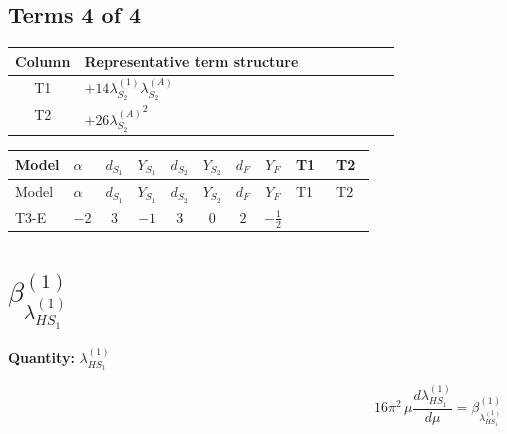\documentclass[8pt]{article}
\begin{document}
\begin{landscape}
\subsection*{Terms 4 of 4}
\begin{center}
\begin{tabular}{@{}c >{\raggedright\arraybackslash}p{0.82\linewidth}@{}}
\toprule
Column & Representative term structure \\
\midrule
T1 & \(\displaystyle +14 {\lambda_{S_2}^{(1)}} {\lambda_{S_2}^{(A)}}\) \\
\midrule
T2 & \(\displaystyle +26 {\lambda_{S_2}^{(A)}}^2\) \\
\midrule
\bottomrule
\end{tabular}
\end{center}
\smallskip
\tiny
\begin{longtable}{@{}llcccccc >{\raggedright\arraybackslash}p{0.21\linewidth} >{\raggedright\arraybackslash}p{0.21\linewidth}@{}}
\toprule
Model & $\alpha$ & $d_{S_1}$ & $Y_{S_1}$ & $d_{S_2}$ & $Y_{S_2}$ & $d_F$ & $Y_F$ & T1 & T2 \\
\midrule
\endfirsthead
\toprule
Model & $\alpha$ & $d_{S_1}$ & $Y_{S_1}$ & $d_{S_2}$ & $Y_{S_2}$ & $d_F$ & $Y_F$ & T1 & T2 \\
\midrule
\endhead
T3-E & $-2$ & $3$ & $-1$ & $3$ & $0$ & $2$ & $-\frac{1}{2}$ & \scriptsize\adjustbox{max width=\linewidth}{$\begin{gathered} +14 {\lambda_{S_2}^{(1)}} {\lambda_{S_2}^{(A)}}\end{gathered}$} & \scriptsize\adjustbox{max width=\linewidth}{$\begin{gathered} +26 {\lambda_{S_2}^{(A)}}^2\end{gathered}$} \\
\midrule
\bottomrule
\end{longtable}
\clearpage
\section*{$\beta_{\lambda_{HS_1}^{(1)}}^{(1)}$}
\noindent\textbf{Quantity: }$\lambda_{HS_1}^{(1)}$\par\smallskip
\[16\pi^2\,\mu\frac{d \lambda_{HS_1}^{(1)}}{d\mu}=\beta_{\lambda_{HS_1}^{(1)}}^{(1)}\]

\end{landscape}
\end{document}
